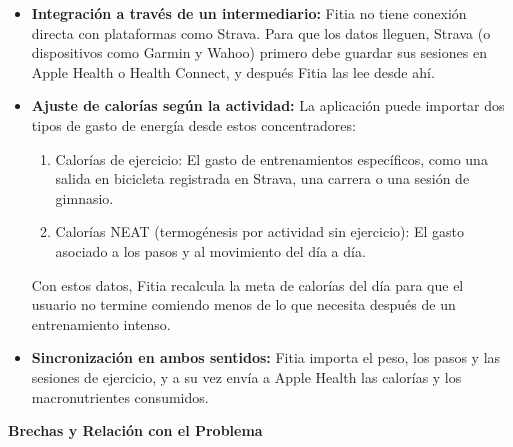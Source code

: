 \begin{itemize}
    \item \textbf{Integración a través de un intermediario:} Fitia no tiene conexión directa con plataformas como Strava. Para que los datos lleguen, Strava (o dispositivos como Garmin y Wahoo) primero debe guardar sus sesiones en Apple Health o Health Connect, y después Fitia las lee desde ahí.
    \item \textbf{Ajuste de calorías según la actividad:} La aplicación puede importar dos tipos de gasto de energía desde estos concentradores:
    \begin{enumerate}
        \item Calorías de ejercicio: El gasto de entrenamientos específicos, como una salida en bicicleta registrada en Strava, una carrera o una sesión de gimnasio.
        \item Calorías NEAT (termogénesis por actividad sin ejercicio): El gasto asociado a los pasos y al movimiento del día a día.
    \end{enumerate}
    Con estos datos, Fitia recalcula la meta de calorías del día para que el usuario no termine comiendo menos de lo que necesita después de un entrenamiento intenso.
    \item \textbf{Sincronización en ambos sentidos:} Fitia importa el peso, los pasos y las sesiones de ejercicio, y a su vez envía a Apple Health las calorías y los macronutrientes consumidos.
\end{itemize}
\newpage
\textbf{Brechas y Relación con el Problema}

